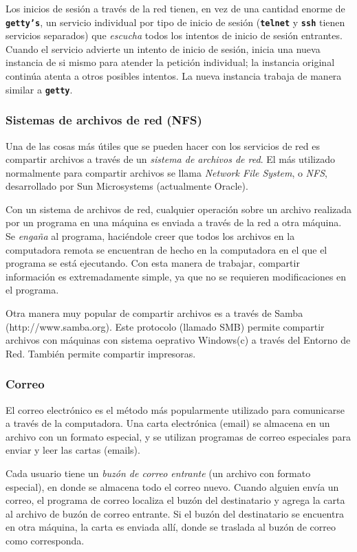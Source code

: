 \documentclass[12pt]{article}
\begin{document}
 Los inicios de sesión a través de la red tienen, en vez de una cantidad
enorme de \texttt{\textbf{getty's}}, un servicio individual por tipo de 
inicio de sesión (\texttt{\textbf{telnet}} y \texttt{\textbf{ssh}}
tienen servicios separados) que \textit{escucha} todos los intentos de inicio de
sesión entrantes. Cuando el servicio advierte un intento de inicio de sesión,
inicia una nueva instancia de si mismo para atender la petición individual; la
instancia original continúa atenta a otros posibles intentos. La nueva instancia
trabaja de manera similar a \texttt{\textbf{getty}}.  


\subsubsection{ Sistemas de archivos de red (NFS)}  

Una de las cosas
más útiles que se pueden hacer con los servicios de red es compartir archivos a
través de un \textit{sistema de archivos de red}. El más utilizado
normalmente para compartir archivos se llama \textit{Network File
System}, o \textit{NFS}, desarrollado por Sun Microsystems (actualmente Oracle).  

 Con un sistema de archivos de red, cualquier operación sobre un archivo
realizada por un programa en una máquina es enviada a través de la red a otra
máquina. Se \textit{engaña} al programa, haciéndole creer que todos los archivos en la
computadora remota se encuentran de hecho en la computadora en el que el programa se
está ejecutando. Con esta manera de trabajar, compartir información es
extremadamente simple, ya que no se requieren modificaciones en el programa.


 Otra manera muy popular de compartir archivos es a través de Samba
(http://www.samba.org). Este protocolo
(llamado SMB) permite compartir archivos con máquinas con sistema oeprativo
Windows(c) a través del Entorno de Red. También permite compartir impresoras.  


\subsubsection{ Correo}

 El correo electrónico es el método más popularmente utilizado para
comunicarse a través de la computadora. Una carta electrónica (email) se almacena en un
archivo con un formato especial, y se utilizan programas de correo especiales
para enviar y leer las cartas (emails).  

 Cada usuario tiene un \textit{buzón de correo entrante} (un
archivo con formato especial), en donde se almacena todo el correo nuevo. Cuando
alguien  envía un correo, el programa de correo localiza el buzón del
destinatario y agrega la carta al archivo de buzón de correo entrante. Si el
buzón del destinatario se encuentra en otra máquina, la carta es enviada allí,
donde se traslada al buzón de correo como corresponda.  
\end{document}
